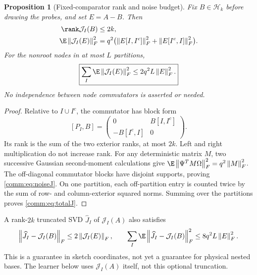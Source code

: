 \documentclass[11pt,oneside,openany,a4paper]{book}
\numberwithin{equation}{chapter}
\newtheorem{proposition}[theorem]{Proposition}
\theoremstyle{definition}
\theoremstyle{remark}
\newcommand{\F}[1]{\left\lVert#1\right\rVert_F}
\newcommand{\HH}{\mathcal H}\newcommand{\SSS}{\mathcal S}
\newcommand{\J}{\mathcal J}\newcommand{\transpose}{\mathsf T}
\begin{document}
\begin{proposition}[Fixed-comparator rank and noise budget]\label{comm:prop:budget}
Fix $B\in\HH_k$ before drawing the probes, and set $E=A-B$. Then
\begin{align}
 \rank\J_I(B)&\le 2k,\label{comm:eq:rankJ}\\
 \E\F{\J_I(E)}^2
 &=q^2\bigl(\F{E[I,I^c]}^2+\F{E[I^c,I]}^2\bigr).\label{comm:eq:noiseJ}
\end{align}
For the nonroot nodes in at most $L$ partitions,
\begin{equation}\label{comm:eq:totalJ}
 \boxed{\sum_I\E\F{\J_I(E)}^2\le2q^2L\F E^2.}
\end{equation}
No independence between node commutators is asserted or needed.
\end{proposition}
\begin{proof}
Relative to $I\cup I^c$, the commutator has block form
\[
 [P_I,B]=\begin{pmatrix}0&B[I,I^c]\\-B[I^c,I]&0\end{pmatrix}.
\]
Its rank is the sum of the two exterior ranks, at most $2k$. Left and right multiplication do not increase rank. For any deterministic matrix $M$, two successive Gaussian second-moment calculations give
$\E\F{\Psi^T M\Omega}^2=q^2\F M^2$.
The off-diagonal commutator blocks have disjoint supports, proving \eqref{comm:eq:noiseJ}. On one partition, each off-partition entry is counted twice by the sum of row- and column-exterior squared norms. Summing over the partitions proves \eqref{comm:eq:totalJ}.
\end{proof}

A rank-$2k$ truncated SVD $\widehat J_I$ of $\J_I(A)$ also satisfies
\[
 \F{\widehat J_I-\J_I(B)}\le2\F{\J_I(E)},\qquad
 \sum_I\E\F{\widehat J_I-\J_I(B)}^2\le8q^2L\F E^2.
\]
This is a guarantee in sketch coordinates, not yet a guarantee for physical nested bases. The learner below uses $\J_I(A)$ itself, not this optional truncation.
\end{document}
